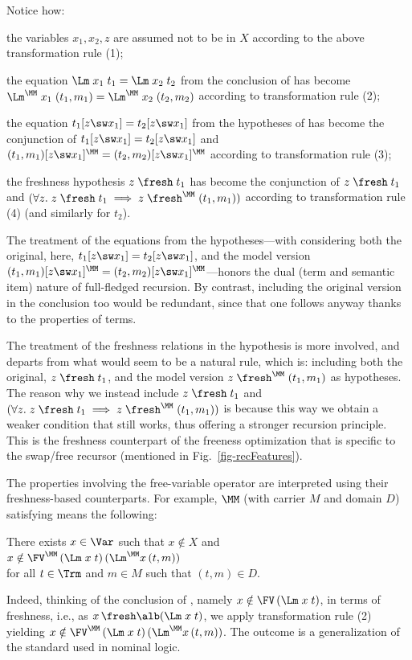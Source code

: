 Notice how:
\begin{mmyitem}
	\item the variables $x_1,x_2,z$ are assumed not to be in $X$ according to the above transformation rule (1);
	\item the equation $\Lm\;x_1\;t_1 = \Lm\;x_2\;t_2$ 
	from the conclusion of \SwCg{} has become 
	$\Lm^\MM\;x_1\;(t_1,m_1) = \Lm^\MM\;x_2\;(t_2,m_2)$ according to transformation  rule (2); 
	\item the equation $t_1[z\sw x_1] = t_2[z\sw x_1]$
	from the hypotheses of \SwCg{} has become the conjunction of 
	$t_1[z\sw x_1] = t_2[z\sw x_1]$ and 
	$(t_1,m_1)[z\sw x_1]^\MM = (t_2,m_2)[z\sw x_1]^\MM$ according to transformation  rule (3); 
	\item the freshness hypothesis $z\;\fresh\;t_1$ has become  
	the conjunction of $z\;\fresh\;t_1$ and 
	$(\forall z.\;  z\;\fresh\;t_1 \implies z\;\fresh^\MM\;(t_1,m_1))$ according to transformation rule (4) 
	(and similarly for $t_2$). 	
\end{mmyitem} 

The treatment of the equations from the hypotheses---with considering both the original, 
here, $t_1[z\sw x_1] = t_2[z\sw x_1]$, and the model version $(t_1,m_1)[z\sw x_1]^\MM = (t_2,m_2)[z\sw x_1]^\MM$---honors the dual (term and semantic item) nature of full-fledged recursion. By contrast, including the original version in the conclusion too would be redundant, since that one follows anyway thanks to the properties of terms. 

The treatment of the freshness relations in the hypothesis is more involved, and departs from what would seem to be a natural rule, which is:  including both the original, $z\;\fresh\;t_1$, and 
the model version $z\;\fresh^\MM\;(t_1,m_1)$ as hypotheses. The reason why we instead include 
$z\;\fresh\;t_1$ and $(\forall z.\;  z\;\fresh\;t_1 \implies z\;\fresh^\MM\;(t_1,m_1))$ is because this way we obtain a weaker condition that still works, thus offering a stronger recursion principle. This is the freshness counterpart of the freeness optimization that is specific to the swap/free recursor (mentioned in Fig.~\ref{fig-recFeatures}). 

The properties involving the free-variable operator are interpreted using their freshness-based counterparts. 
For example, $\MM$ (with carrier $M$ and domain $D$) satisfying \FCB{} means the following: 
\begin{center}
There exists $x \in \Var$ such that 
$x\notin X$ and
\\
$x\notin \FV^\MM\,(\Lm\;x\;t)\,(\Lm^\MM x\,(t,m))$ 
\\for all $t\in\Trm$ and $m\in M$ such that 
$(t,m) \in D$.  
\end{center} 
%
Indeed, thinking of the conclusion of \FCB{} , namely $x\notin \FV\,(\Lm\;x\;t)$, in terms of freshness, i.e., as $x \,\fresh \alb (\Lm\;x\;t)$, we apply transformation rule (2) yielding 
$x\notin \FV^\MM\,(\Lm\;x\;t)\,(\Lm^\MM x\,(t,m))$. 
%
The outcome is a generalization of the standard \FCB{} used in nominal logic. 

